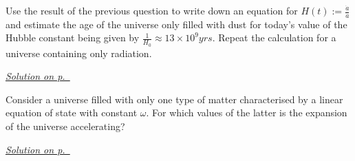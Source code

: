 \begin{exercise}\label{ex:cosmology-5}
Use the result of the previous question to write down an equation for $H(t) := \frac{\dot{a}}{a}$ and estimate the age of the universe only filled with dust for today's value of the Hubble constant being given by $\frac{1}{H_0} \approx 13\times 10^9yrs$. Repeat the calculation for a universe containing only radiation.
\end{exercise}
\hyperref[sol:cosmology-5]{\small \textit{Solution on p.~\pageref*{sol:cosmology-5}}}

\begin{exercise}\label{ex:cosmology-6}
Consider a universe filled with only one type of matter characterised by a linear equation of state with constant $\omega$. For which values of the latter is the expansion of the universe accelerating?
\end{exercise}
\hyperref[sol:cosmology-6]{\small \textit{Solution on p.~\pageref*{sol:cosmology-6}}}
